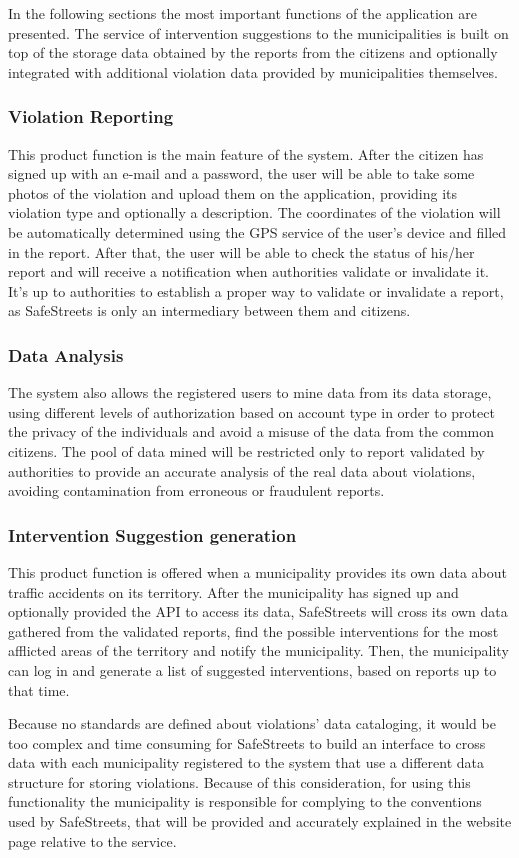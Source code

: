 In the following sections the most important functions of the application are presented. The service of intervention suggestions to the municipalities is built on top of the storage data obtained by the reports from the citizens and optionally integrated with additional violation data provided by municipalities themselves.
\subsubsection{Violation Reporting}
This product function is the main feature of the system. After the citizen has signed up with an e-mail and a password, the user will be able to take some photos of the violation and upload them on the application, providing its violation type and optionally a description. The coordinates of the violation will be automatically determined using the GPS service of the user's device and filled in the report. After that, the user will be able to check the status of his/her report and will receive a notification when authorities validate or invalidate it. It's up to authorities to establish a proper way to validate or invalidate a report, as SafeStreets is only an intermediary between them and citizens. 
\subsubsection{Data Analysis}
The system also allows the registered users to mine data from its data storage, using different levels of authorization based on account type in order to protect the privacy of the individuals and avoid a misuse of the data from the common citizens. The pool of data mined will be restricted only to report validated by authorities to provide an accurate analysis of the real data about violations, avoiding contamination from erroneous or fraudulent reports.
\subsubsection{Intervention Suggestion generation}
This product function is offered when a municipality provides its own data about traffic accidents on its territory. After the municipality has signed up and optionally provided the API to access its data, SafeStreets will cross its own data gathered from the validated reports, find the possible interventions for the most afflicted areas of the territory and notify the municipality. Then, the municipality can log in and generate a list of suggested interventions, based on reports up to that time.

Because no standards are defined about violations' data cataloging, it would be too complex and time consuming for SafeStreets to build an interface to cross data with each municipality registered to the system that use a different data structure for storing violations. Because of this consideration, for using this functionality the municipality is responsible for complying to the conventions used by SafeStreets, that will be provided and accurately explained in the website page relative to the service.